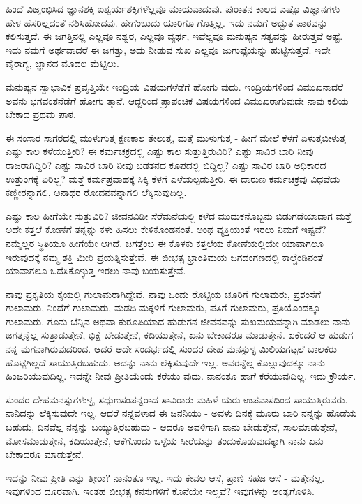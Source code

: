 ಹಿಂದೆ ವಿಜೃಂಭಿಸಿದ ಜ್ಞಾನಶಕ್ತಿ ಐಶ್ವರ್ಯಶಕ್ತಿಗಳೆಲ್ಲವೂ ಮಾಯವಾದುವು. ಪುರಾತನ ಕಾಲದ ಎಷ್ಟೊ ವಿಜ್ಞಾನಗಳು ಹೇಳ ಹೆಸರಿಲ್ಲದಂತೆ ನಶಿಸಿಹೋದವು. ಹೇಗೆಂಬುದು ಯಾರಿಗೂ ಗೊತ್ತಿಲ್ಲ. ಇದು ನಮಗೆ ಅದ್ಭುತ ಪಾಠವನ್ನು ಕಲಿಸುತ್ತದೆ. ಈ ಜಗತ್ತಿನಲ್ಲಿ ಎಲ್ಲವೂ ನಶ್ವರ, ಎಲ್ಲವೂ ವ್ಯರ್ಥ, ಇವೆಲ್ಲವೂ ಮನುಷ್ಯನ ಸತ್ವವನ್ನು ಹೀರುತ್ತವೆ ಅಷ್ಟೆ. ಇದು ನಮಗೆ ಅರ್ಥವಾದರೆ ಈ ಜಗತ್ತು, ಅದು ನೀಡುವ ಸುಖ ಎಲ್ಲವೂ ಜುಗುಪ್ಸೆಯನ್ನು ಹುಟ್ಟಿಸುತ್ತದೆ. ಇದೇ ವೈರಾಗ್ಯ, ಜ್ಞಾನದ ಮೊದಲ ಮೆಟ್ಟಿಲು.

ಮನುಷ್ಯನ ಸ್ವಾಭಾವಿಕ ಪ್ರವೃತ್ತಿಯೇ ಇಂದ್ರಿಯ ವಿಷಯಗಳೆಡೆಗೆ ಹೋಗು ವುದು. ಇಂದ್ರಿಯಗಳಿಂದ ವಿಮುಖನಾದರೆ ಅವನು ಭಗವಂತನೆಡೆಗೆ ಹೋಗು ತ್ತಾನೆ. ಆದ್ದರಿಂದ ಪ್ರಾಪಂಚಿಕ ವಿಷಯಗಳಿಂದ ವಿಮುಖರಾಗುವುದೇ ನಾವು ಕಲಿಯ ಬೇಕಾದ ಪ್ರಥಮ ಪಾಠ.

ಈ ಸಂಸಾರ ಸಾಗರದಲ್ಲಿ ಮುಳುಗುತ್ತ ಕ್ಷಣಕಾಲ ತೇಲುತ್ತ, ಮತ್ತೆ ಮುಳುಗುತ್ತ - ಹೀಗೆ ಮೇಲೆ ಕೆಳಗೆ ಏಳುತ್ತಬೀಳುತ್ತ ಎಷ್ಟು ಕಾಲ ಕಳೆಯುತ್ತೀರಿ? ಈ ಕರ್ಮಚಕ್ರದಲ್ಲಿ ಎಷ್ಟು ಕಾಲ ಸುತ್ತುತ್ತಿರುವಿರಿ? ಎಷ್ಟು ಸಾವಿರ ಬಾರಿ ನೀವು ರಾಜರಾಗಿದ್ದಿರಿ? ಎಷ್ಟು ಸಾವಿರ ಬಾರಿ ನೀವು ಬಡತನದ ಕೂಪದಲ್ಲಿ ಬಿದ್ದಿಲ್ಲ? ಎಷ್ಟು ಸಾವಿರ ಬಾರಿ ಅಧಿಕಾರದ ಉತ್ತುಂಗಕ್ಕೆ ಏರಿಲ್ಲ? ಮತ್ತೆ ಕರ್ಮಪ್ರವಾಹಕ್ಕೆ ಸಿಕ್ಕಿ ಕೆಳಗೆ ಎಳೆಯಲ್ಪಡುತ್ತೀರಿ. ಈ ದಾರುಣ ಕರ್ಮಚಕ್ರವು ವಿಧವೆಯ ಕಣ್ಣೀರನ್ನಾಗಲಿ, ಅನಾಥರ ರೋದನವನ್ನಾಗಲಿ ಲೆಕ್ಕಿಸುವುದಿಲ್ಲ.

ಎಷ್ಟು ಕಾಲ ಹೀಗೆಯೇ ಸುತ್ತುವಿರಿ? ಜೀವನವಿಡೀ ಸೆರೆಮನೆಯಲ್ಲಿ ಕಳೆದ ಮುದುಕನೊಬ್ಬನು ಬಿಡುಗಡೆಯಾದಾಗ ಮತ್ತೆ ಅದೇ ಕತ್ತಲೆ ಕೋಣೆಗೆ ತನ್ನನ್ನು ಕಳು ಹಿಸಲು ಕೇಳಿಕೊಂಡನಂತೆ. ಅಂಥ ವ್ಯಕ್ತಿಯಂತೆ ಇರಲು ನಿಮಗೆ ಇಷ್ಟವೆ? ನಮ್ಮೆಲ್ಲರ ಸ್ಥಿತಿಯೂ ಹೀಗೆಯೇ ಆಗಿದೆ. ಜಗತ್ತೆಂಬ ಈ ಕೊಳಕು ಕತ್ತಲೆಯ ಕೋಣೆಯಲ್ಲಿಯೇ ಯಾವಾಗಲೂ ಇರುವುದಕ್ಕೆ ನಮ್ಮ ಶಕ್ತಿ ಮೀರಿ ಪ್ರಯತ್ನಿಸುತ್ತೇವೆ. ಈ ಬೀಭತ್ಸ ಭ್ರಾಂತಿಮಯ ಜಗದಂಗಣದಲ್ಲಿ ಕಾಲ್ಚೆಂಡಿನಂತೆ ಯಾವಾಗಲೂ ಒದೆಸಿಕೊಳ್ಳುತ್ತ ಇರಲು ನಾವು ಬಯಸುತ್ತೇವೆ.

ನಾವು ಪ್ರಕೃತಿಯ ಕೈಯಲ್ಲಿ ಗುಲಾಮರಾಗಿದ್ದೇವೆ. ನಾವು ಒಂದು ರೊಟ್ಟಿಯ ಚೂರಿಗೆ ಗುಲಾಮರು, ಪ್ರಶಂಸೆಗೆ ಗುಲಾಮರು, ನಿಂದೆಗೆ ಗುಲಾಮರು, ಮಡದಿ ಮಕ್ಕಳಿಗೆ ಗುಲಾಮರು, ಪತಿಗೆ ಗುಲಾಮರು, ಪ್ರತಿಯೊಂದಕ್ಕೂ ಗುಲಾಮರು. ಗೂನು ಬೆನ್ನಿನ ಅಥವಾ ಕುರೂಪಿಯಾದ ಹುಡುಗನ ಜೀವನವನ್ನು ಸುಖಮಯವನ್ನಾಗಿ ಮಾಡಲು ನಾನು ಜಗತ್ತನ್ನೆಲ್ಲ ಸುತ್ತಾಡುತ್ತೇನೆ, ಭಿಕ್ಷೆ ಬೇಡುತ್ತೇನೆ, ಕದಿಯುತ್ತೇನೆ, ಏನು ಬೇಕಾದರೂ ಮಾಡುತ್ತೇನೆ. ಏಕೆಂದರೆ ಆ ಹುಡುಗ ನನ್ನ ಮಗನಾಗಿರುವುದರಿಂದ. ಆದರೆ ಅದೇ ಸಂದರ್ಭದಲ್ಲಿ ಸುಂದರ ದೇಹ ಮನಸ್ಸುಳ್ಳ ಮಿಲಿಯಗಟ್ಟಲೆ ಬಾಲಕರು ಹೊಟ್ಟೆಗಿಲ್ಲದೆ ಸಾಯುತ್ತಿರಬಹುದು. ಅದನ್ನು ನಾನು ಲೆಕ್ಕಿಸುವುದೇ ಇಲ್ಲ. ಅವರನ್ನೆಲ್ಲ ಕೊಲ್ಲುವುದಕ್ಕೂ ನಾನು ಹಿಂಜರಿಯುವುದಿಲ್ಲ. ಇದನ್ನೇ ನೀವು ಪ್ರೀತಿಯೆಂದು ಕರೆಯು ವುದು. ನಾನಂತೂ ಹಾಗೆ ಕರೆಯುವುದಿಲ್ಲ. ಇದು ಕ್ರೌರ್ಯ.

ಸುಂದರ ದೇಹಮನಸ್ಸುಗಳುಳ್ಳ, ಸದ್ಗುಣಸಂಪನ್ನರಾದ ಸಾವಿರಾರು ಮಹಿಳೆ ಯರು ಉಪವಾಸದಿಂದ ಸಾಯುತ್ತಿರುವರು. ನಾನಿದನ್ನು ಲೆಕ್ಕಿಸುವುದೇ ಇಲ್ಲ. ಆದರೆ ನನ್ನವಳಾದ ಈ ಜನನಿಯು - ಅವಳು ದಿನಕ್ಕೆ ಮೂರು ಬಾರಿ ನನ್ನನ್ನು ಹೊಡೆಯ ಬಹುದು, ದಿನವೆಲ್ಲ ನನ್ನನ್ನು ಬಯ್ಯುತ್ತಿರಬಹುದು - ಆದರೂ ಅವಳಿಗಾಗಿ ನಾನು ಬೇಡುತ್ತೇನೆ, ಸಾಲಮಾಡುತ್ತೇನೆ, ಮೋಸಮಾಡುತ್ತೇನೆ, ಕದಿಯುತ್ತೇನೆ, ಆಕೆಗೊಂದು ಒಳ್ಳೆಯ ಸೀರೆಯನ್ನು ತಂದುಕೊಡುವುದಕ್ಕಾಗಿ ನಾನು ಏನು ಬೇಕಾದರೂ ಮಾಡುತ್ತೇನೆ.

ಇದನ್ನು ನೀವು ಪ್ರೀತಿ ಎನ್ನು ತ್ತೀರಾ? ನಾನಂತೂ ಇಲ್ಲ. ಇದು ಕೇವಲ ಆಸೆ, ಪ್ರಾಣಿ ಸಹಜ ಆಸೆ - ಮತ್ತೇನಲ್ಲ. ಇವುಗಳಿಂದ ದೂರವಾಗಿ. ಇಂತಹ ಬೀಭತ್ಸ ಕನಸುಗಳಿಗೆ ಕೊನೆಯೇ ಇಲ್ಲವೆ? ಇವುಗಳನ್ನು ಅಂತ್ಯಗೊಳಿಸಿ.

